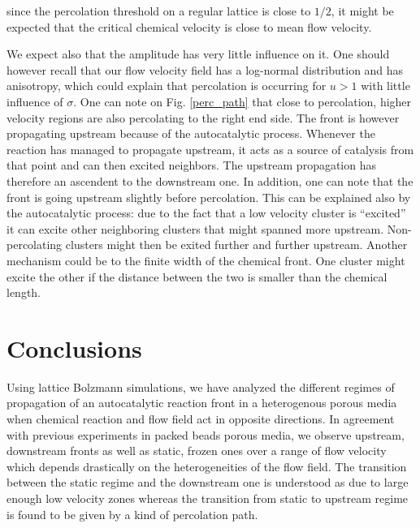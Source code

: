 \documentclass[doublecol]{epl2}
\begin{document}
since the percolation threshold on a regular lattice is close to $1/2$, it might be expected that the critical chemical velocity is close to mean flow velocity.


We expect also that the amplitude has very little influence on it. One should however recall that our flow  velocity field has a log-normal distribution and has anisotropy, which could explain that percolation is occurring for $u>1$ with little influence of $\sigma$.
One can note on Fig. \ref{perc_path} that close to percolation, higher velocity regions are also percolating to the right end side. The front is however propagating upstream because of the autocatalytic process. Whenever the reaction has managed to propagate upstream, it acts as a source of catalysis from that point and can then excited neighbors. The upstream propagation has therefore an ascendent to the downstream one.
In addition, one can note that the front is going upstream slightly before percolation. This can be explained also by the autocatalytic process: due to the fact that a low velocity cluster is ``excited'' it can excite other neighboring clusters that might spanned more upstream. Non-percolating clusters might then be exited further and further upstream.
Another mechanism could be to the finite width of the chemical front. One cluster might excite the other if the distance between the two is smaller than the chemical length.


\section{Conclusions}
Using lattice Bolzmann simulations, we have analyzed the different regimes of propagation of an autocatalytic reaction front in a heterogenous porous media when chemical reaction and flow field act in opposite directions. In agreement with previous experiments in packed beads porous media, we observe upstream, downstream fronts as well as static, frozen ones over a range of flow velocity which depends drastically on the heterogeneities of the flow field. The transition between the static regime and the downstream one is understood as due to large enough low velocity zones whereas the transition from static to upstream regime is found to be given by a kind of percolation path.




 	
	
\end{document}
